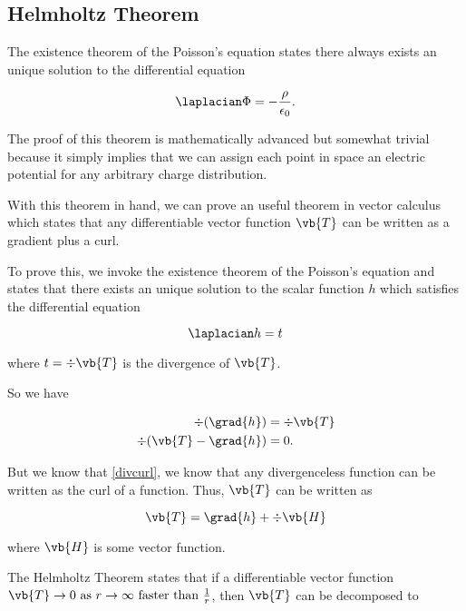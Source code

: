 \documentclass[english,a4paper,12pt]{report}
\begin{document}
	
\subsection{Helmholtz Theorem}
	
The existence theorem of the Poisson's equation states there always exists an unique solution to the differential equation

\begin{equation}
	\laplacian \Phi = -\frac{\rho }{\epsilon_0}  .
\end{equation}

The proof of this theorem is mathematically advanced but somewhat trivial because it simply implies that we can assign each point in space an electric potential for any arbitrary charge distribution.
	
With this theorem in hand, we can prove an useful theorem in vector calculus which states that any differentiable vector function \(\vb{T} \) can be written as a gradient plus a curl.
	
To prove this, we invoke the existence theorem of the Poisson's equation and states that there exists an unique solution to the scalar function \(h\) which satisfies the differential equation 

\begin{equation}
	\laplacian h = t
\end{equation}

where \(t = \div{\vb{T} } \) is the divergence of \(\vb{T} \).

So we have 

\begin{equation}
	\begin{aligned}
		\div{(\grad{h} )} &= \div{\vb{T} }  \\
		\div{(\vb{T} - \grad{h} )} &= 0.
	\end{aligned}
\end{equation}
	
But we know that \cref{divcurl}, we know that any divergenceless function can be written as the curl of a function. Thus, \(\vb{T} \) can be written as 

\begin{equation}
	\vb{T} = \grad{h} + \div{\vb{H} } 
\end{equation}

where \(\vb{H} \) is some vector function.

The Helmholtz Theorem states that if a differentiable vector function \(\vb{T} \rightarrow 0 \text{ as } r \rightarrow \infty \text{ faster than } \frac{1}{r} \), then \(\vb{T} \) can be decomposed to
\end{document}
